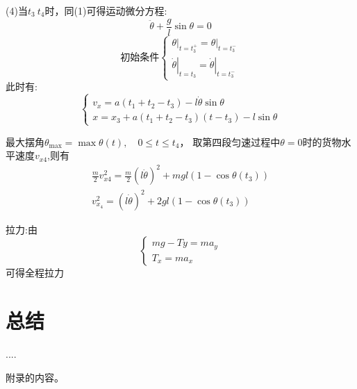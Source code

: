 \documentclass{cumcmthesis}
\begin{document}
(4)当$t_3~t_4$时，同(1)可得运动微分方程:
$$\ddot{\theta}+\frac{g}{l} \sin \theta=0$$
$$\text{初始条件}\left \{\begin{array}{l}
        \left.\theta\right|_{t=t_{3}^{+}}=\left.\theta\right|_{t=t_{3}^{-}} \\
        \left.\dot{\theta}\right|_{t=t_{3}}=\left.\dot{\theta}\right|_{t=t_{3}^{-}}
    \end{array}\right.$$
此时有:$$\left\{\begin{array}{l}
    v_{x}=a\left(t_1+t_{2}-t_{3}\right)-l \dot{\theta} \sin \theta \\
    x=x_{3}+a\left(t_{1}+t_{2}-t_{3}\right)\left(t-t_{3}\right)-l \sin \theta
    \end{array}\right.$$

最大摆角$\theta_{\max }=\max \theta(t), \quad 0 \leqslant t \leqslant t_{4}$，
取第四段匀速过程中$\theta=0$时的货物水平速度$v_{x4}$,则有
$$\begin{array}{l}
    \frac{m}{2} v_{x 4}^{2}=\frac{m}{2}(l \dot{\theta})^{2}+m g l\left(1-\cos \theta\left(t_{3}\right)\right) \\
    v_{x_{4}}^{2}=(l \dot{\theta})^{2}+2 g l\left(1-\cos \theta\left(t_{3}\right)\right)
    \end{array}$$

拉力:由$$\left\{\begin{array}{l}
    m g-T y=m a_y \\
    T_{x}=m a_{x}
    \end{array}\right.$$
可得全程拉力

\section{总结}
\begin{thebibliography}{9}%
     ....
\end{thebibliography}
\begin{appendices}
    附录的内容。
\end{appendices}
\end{document}
